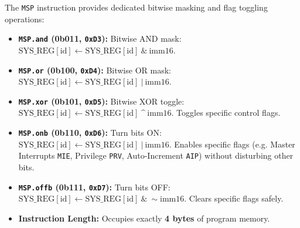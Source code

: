 \documentclass[11pt,a4paper]{article}
\begin{document}
\begin{instructiondesc}[title={Bitwise Mask and Bit-Field Modification Modes (4 Bytes)}]
The \texttt{MSP} instruction provides dedicated bitwise masking and flag toggling operations:
\begin{itemize}[leftmargin=8pt,itemsep=0.5pt,topsep=0.5pt,parsep=0pt]
    \item \textbf{\texttt{MSP.and} (0b011, \texttt{0xD3}):} Bitwise AND mask: \(\text{SYS\_REG}[\text{id}] \leftarrow \text{SYS\_REG}[\text{id}] \ \& \ \text{imm16}\).
    \item \textbf{\texttt{MSP.or} (0b100, \texttt{0xD4}):} Bitwise OR mask: \(\text{SYS\_REG}[\text{id}] \leftarrow \text{SYS\_REG}[\text{id}] \ | \ \text{imm16}\).
    \item \textbf{\texttt{MSP.xor} (0b101, \texttt{0xD5}):} Bitwise XOR toggle: \(\text{SYS\_REG}[\text{id}] \leftarrow \text{SYS\_REG}[\text{id}] \ \text{\textasciicircum} \ \text{imm16}\). Toggles specific control flags.
    \item \textbf{\texttt{MSP.onb} (0b110, \texttt{0xD6}):} Turn bits ON: \(\text{SYS\_REG}[\text{id}] \leftarrow \text{SYS\_REG}[\text{id}] \ | \ \text{imm16}\). Enables specific flags (e.g. Master Interrupts \texttt{MIE}, Privilege \texttt{PRV}, Auto-Increment \texttt{AIP}) without disturbing other bits.
    \item \textbf{\texttt{MSP.offb} (0b111, \texttt{0xD7}):} Turn bits OFF: \(\text{SYS\_REG}[\text{id}] \leftarrow \text{SYS\_REG}[\text{id}] \ \& \ \sim\text{imm16}\). Clears specific flags safely.
    \item \textbf{Instruction Length:} Occupies exactly \textbf{4 bytes} of program memory.
\end{itemize}
\end{instructiondesc}
\end{document}

